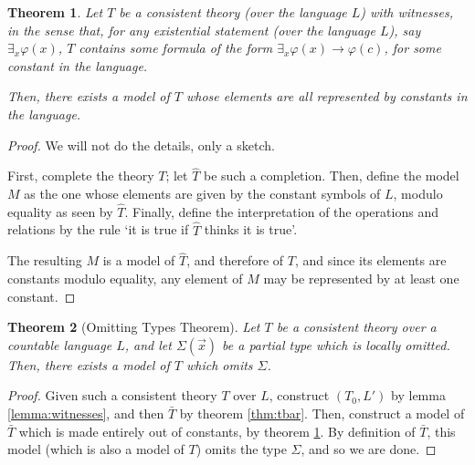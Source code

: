 \documentclass{article}
\newtheorem{theorem}{Theorem}
\theoremstyle{nonumberplain}
\newtheorem{proof}{Proof}
\begin{document}
\begin{theorem}\label{thm:modconst}
Let $T$ be a consistent theory (over the language $L$) \emph{with witnesses}, in the sense that, for any existential statement (over the language $L$), say $\exists_x \varphi(x)$, $T$ contains some formula of the form $\exists_x \varphi(x) \rightarrow \varphi(c)$, for some constant in the language.

Then, there exists a model of $T$ whose elements are all represented by constants in the language.
\end{theorem}

\begin{proof}
We will not do the details, only a sketch.

First, complete the theory $T$; let $\widehat T$ be such a completion. Then, define the model $M$ as the one whose elements are given by the constant symbols of $L$, modulo equality as seen by $\widehat T$. Finally, define the interpretation of the operations and relations by the rule `it is true if $\widehat T$ thinks it is true'.

The resulting $M$ is a model of $\widehat T$, and therefore of $T$, and since its elements are constants modulo equality, any element of $M$ may be represented by at least one constant.
\end{proof}

\begin{theorem}[Omitting Types Theorem]
Let $T$ be a consistent theory over a countable language $L$, and let $\Sigma(\vec x)$ be a partial type which is locally omitted. Then, there exists a model of $T$ which omits $\Sigma$.
\end{theorem}

\begin{proof}
Given such a consistent theory $T$ over $L$, construct $(T_0, L')$ by lemma \ref{lemma:witnesses}, and then $\bar T$ by theorem \ref{thm:tbar}. Then, construct a model of $\bar T$ which is made entirely out of constants, by theorem \ref{thm:modconst}. By definition of $\bar T$, this model (which is also a model of $T$) omits the type $\Sigma$, and so we are done.
\end{proof}
\end{document}
